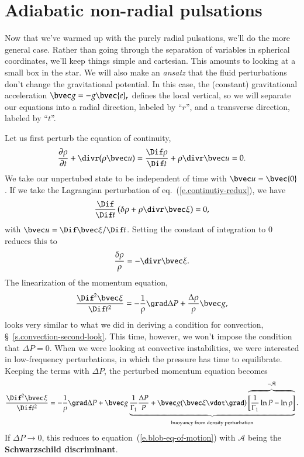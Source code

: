 \section{Adiabatic non-radial pulsations}\label{s.adiabatic-non-radial}
Now that we've warmed up with the purely radial pulsations, we'll do the more general case.  Rather than going through the separation of variables in spherical coordinates, we'll keep things simple and cartesian.  This amounts to looking at a small box in the star.  We will also make an \emph{ansatz} that the fluid perturbations don't change the gravitational potential.  In this case, the (constant) gravitational acceleration $\vg = -g\bvec{e}_{r}$ defines the local vertical, so we will separate our equations into a radial direction, labeled by ``$r$'', and a transverse direction, labeled by ``$t$''.

Let us first perturb the equation of continuity,
\begin{equation}\label{e.continutiy-redux}
 \frac{\partial\rho}{\partial t} + \divr(\rho \vu) = \frac{\Dif\rho}{\Dif t} + \rho\divr\vu =  0.
\end{equation} 
We take our unpertubed state to be independent of time with $\vu = \bvec{0}$. If we take the Lagrangian perturbation of eq.~(\ref{e.continutiy-redux}), we have
\[ \frac{\Dif}{\Dif t}\left(\delta\rho + \rho\divr\vxi\right) = 0, \]
with $\vu = \Dif\vxi/\Dif t$.  Setting the constant of integration to $0$ reduces this to 
\[ \frac{\delta\rho}{\rho} = -\divr\vxi. \]
The linearization of the momentum equation,
\begin{equation}\label{e.momentum-redux}
 \frac{\Dif^{2} \vxi}{\Dif t^{2}} = - \frac{1}{\rho}\grad\Delta P + \frac{\Delta \rho}{\rho}\vg,
\end{equation}
looks very similar to what we did in deriving a condition for convection, \S~\ref{s.convection-second-look}. This time, however, we won't impose the condition that $\Delta P = 0$. When we were looking at convective instabilities, we were interested in low-frequency perturbations, in which the pressure has time to equilibrate.  Keeping the terms with $\Delta P$, the perturbed momentum equation becomes
\begin{equation}\label{e.perturbed-momentum-2}
\frac{\Dif^{2}\vxi}{\Dif t^{2}} = - \frac{1}{\rho}\grad\Delta P +  
\vg \underbrace{\frac{1}{\Gamma_{1}}\frac{\Delta P}{P} + \vg(\vxi\vdot\grad)
 \overbrace{\left[\frac{1}{\Gamma_{1}}\ln P-\ln \rho\right]}^{-\mathcal{A}}}_{\textrm{buoyancy from density perturbation}}.
\end{equation}
If $\Delta P\to 0$, this reduces to equation~(\ref{e.blob-eq-of-motion}) with $\mathcal{A}$ being the \textbf{Schwarzschild discriminant}.


